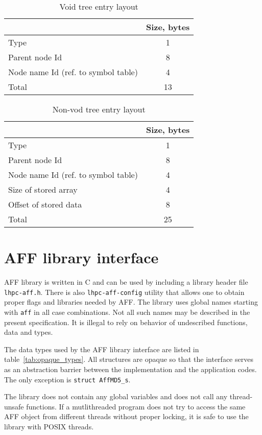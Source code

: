 \documentclass[10pt,letterpaper]{article}
\newcommand{\bc}{\begin{center}}
\newcommand{\ec}{\end{center}}
\newcommand{\ctext}[1]{\texttt{#1}}         %
\newcommand{\ctype}[1]{\ctext{#1}}          %
\begin{document}
\begin{table}[h]
\bc
\caption{Void tree entry layout}
\label{tab:void}
\begin{tabular}{|l|c|} \hline
 & Size, bytes \\ \hline\hline
Type & 1 \\ \hline
Parent node Id & 8 \\ \hline
Node name Id (ref. to symbol table) & 4 \\ \hline\hline
Total & 13 \\ \hline
\end{tabular}
\ec
\end{table}

\begin{table}[h]
\bc
\caption{Non-vod tree entry layout}
\label{tab:tree_entry}
\begin{tabular}{|l|c|} \hline
 & Size, bytes \\ \hline\hline
Type & 1 \\ \hline
Parent node Id & 8 \\ \hline
Node name Id (ref. to symbol table) & 4 \\ \hline
Size of stored array & 4 \\ \hline
Offset of stored data & 8 \\ \hline\hline
Total & 25 \\ \hline
\end{tabular}
\ec
\end{table}

\newpage
\section{AFF library interface}
AFF library is written in C and can be used by including a library
header file \verb|lhpc-aff.h|.  There is also \verb|lhpc-aff-config|
utility that allows one to obtain proper flags and libraries needed by
AFF.  The library uses global names starting with \verb|aff| in all case
combinations.  Not all such names may be described in the present
specification.  It is illegal to rely on behavior of undescribed
functions, data and types.

The data types used by the AFF library interface are listed in
table~\ref{tab:opaque_types}. All structures are opaque so that
the interface serves as an abstraction barrier between the
implementation and the application codes. The only exception is
\ctype{struct AffMD5\_s}.

The library does not contain any global variables and does not call
any thread-unsafe functions. If a mutlithreaded program does not try
to access the same AFF object from different threads without proper
locking, it is safe to use the library with POSIX threads.
\end{document}
